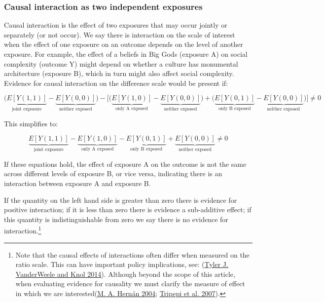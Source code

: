 \documentclass[
  singlecolumn]{report}
\begin{document}
\hypertarget{causal-interaction-as-two-independent-exposures}{%
\subsubsection{\texorpdfstring{\textbf{Causal interaction as two
independent
exposures}}{Causal interaction as two independent exposures}}\label{causal-interaction-as-two-independent-exposures}}

Causal interaction is the effect of two exposures that may occur jointly
or separately (or not occur). We say there is interaction on the scale
of interest when the effect of one exposure on an outcome depends on the
level of another exposure. For example, the effect of a beliefs in Big
Gods (exposure A) on social complexity (outcome Y) might depend on
whether a culture has monumental architecture (exposure B), which in
turn might also affect social complexity. Evidence for causal
interaction on the difference scale would be present if:

\[\bigg(\underbrace{E[Y(1,1)]}_{\text{joint exposure}} - \underbrace{E[Y(0,0)]}_{\text{neither exposed}}\bigg) - \bigg[ \bigg(\underbrace{E[Y(1,0)]}_{\text{only A exposed}} - \underbrace{E[Y(0,0)]}_{\text{neither exposed}}\bigg) + \bigg(\underbrace{E[Y(0,1)]}_{\text{only B exposed}} - \underbrace{E[Y(0,0)]}_{\text{neither exposed}} \bigg)\bigg] \neq 0 \]

This simplifies to:

\[ \underbrace{E[Y(1,1)]}_{\text{joint exposure}} - \underbrace{E[Y(1,0)]}_{\text{only A exposed}} - \underbrace{E[Y(0,1)]}_{\text{only B exposed}} + \underbrace{E[Y(0,0)]}_{\text{neither exposed}} \neq 0 \]

If these equations hold, the effect of exposure A on the outcome is not
the same across different levels of exposure B, or vice versa,
indicating there is an interaction between exposure A and exposure B.

If the quantity on the left hand side is greater than zero there is
evidence for positive interaction; if it is less than zero there is
evidence a sub-additive effect; if this quantity is indistinguishable
from zero we say there is no evidence for interaction.\footnote{Note
  that the causal effects of interactions often differ when measured on
  the ratio scale. This can have important policy implications, see:
  (\protect\hyperlink{ref-vanderweele2014}{Tyler J. VanderWeele and Knol
  2014}). Although beyond the scope of this article, when evaluating
  evidence for causality we must clarify the measure of effect in which
  we are interested(\protect\hyperlink{ref-hernuxe1n2004}{M. A. Hernán
  2004}; \protect\hyperlink{ref-tripepi2007}{Tripepi et al. 2007}).}
\end{document}
